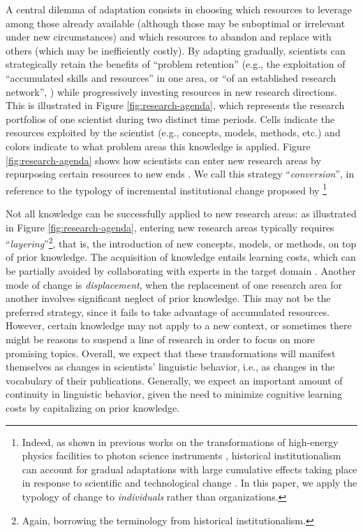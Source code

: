 \documentclass{article}
\begin{document}
A central dilemma of adaptation consists in choosing which  resources to leverage among those already available (although those may be suboptimal or irrelevant under new circumstances) and which resources to abandon and replace with others (which may be inefficiently costly). 
By adapting gradually, scientists can strategically retain  the benefits of ``problem retention'' (e.g., the exploitation of ``accumulated skills and resources'' in one area, or ``of an established research network'', \citealt[p.~106]{Gieryn1978}) while progressively investing resources in new research directions.
This is illustrated in Figure \ref{fig:research-agenda}, 
which represents the research portfolios of one scientist during two distinct time periods. Cells indicate the resources exploited by the scientist (e.g., concepts, models, methods, etc.) and colors indicate to what problem areas this knowledge is applied.
Figure \ref{fig:research-agenda} shows how scientists can enter new research areas by repurposing certain resources to new ends \citep{Mulkay1974,schon1963displacement}. We call this strategy ``\textit{conversion}'', in reference to the typology of incremental institutional change proposed by \citet{mahoney_thelen_2009}\footnote{Indeed, as shown in previous works on the transformations of high-energy physics facilities to photon science instruments \citep{Hallonsten2013,hallonsten2015formation,Heinze2017a}, historical institutionalism can account for gradual adaptations with large cumulative effects taking place in response to scientific and technological change \citep{Heinze2012}. In this paper, we apply the typology of change to \textit{individuals} rather than organizations.}

Not all knowledge can be successfully applied to new research areas: %
as illustrated in Figure \ref{fig:research-agenda}, entering new research areas typically requires ``\textit{layering}''\footnote{Again, borrowing the terminology from historical institutionalism.}, that is, the introduction of new concepts, models, or methods, on top of prior knowledge. The acquisition of knowledge entails learning costs, which can be partially avoided by collaborating with experts in the target domain \citep{Tripodi2020}. Another mode of change is \textit{displacement}, when the replacement of one research area for another involves significant neglect of prior knowledge. %
This may not be the preferred strategy, since it fails to take advantage of accumulated resources. However, certain knowledge may not apply to a new context, or sometimes there might be reasons to suspend a line of research in order to focus on more promising topics. Overall, we expect that these transformations will manifest themselves as changes in scientists' linguistic behavior, i.e., as changes in the vocabulary of their publications. Generally, we expect an important amount of continuity in linguistic behavior, given the need to minimize cognitive learning costs by capitalizing on prior knowledge.
\end{document}
